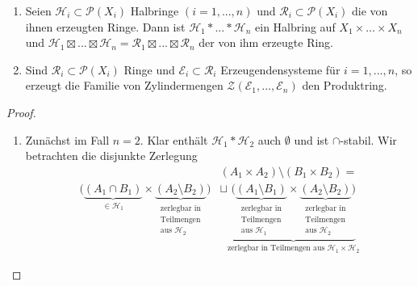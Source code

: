 \begin{proposition}
\begin{mdframed}
\begin{enumerate}[(\roman*),topsep=5pt]
	\item Seien $\mathcal{H}_i \subset \mathcal{P}(X_i)$ Halbringe $(i=1,...,n)$ und $\mathcal{R}_i \subset \mathcal{P}(X_i)$ die von ihnen erzeugten Ringe. Dann ist $\mathcal{H}_1 \ast ... \ast \mathcal{H}_n$ ein Halbring auf $X_1 \times ... \times X_n$ und $\mathcal{H}_1 \boxtimes ... \boxtimes \mathcal{H}_n =\mathcal{R}_1 \boxtimes ... \boxtimes \mathcal{R}_n$ der von ihm erzeugte Ring.
	\item Sind $\mathcal{R}_i \subset \mathcal{P}(X_i)$ Ringe und $\mathcal{E}_i \subset \mathcal{R}_i$ Erzeugendensysteme für $i=1,...,n$, so erzeugt die Familie von Zylindermengen $\mathcal{Z}(\mathcal{E}_1,...,\mathcal{E}_n)$ den Produktring.
\end{enumerate}
\end{mdframed}
\label{propC}
\begin{proof} \
\begin{enumerate}[(\roman*),topsep=5pt]
	\item Zunächst im Fall $n=2$. Klar enthält $\mathcal{H}_1 \ast \mathcal{H}_2$ auch $\emptyset$ und ist $\cap$-stabil. Wir betrachten die disjunkte Zerlegung
	\begin{equation*}
	\begin{split}
		&(A_1 \times A_2) \setminus (B_1 \times B_2) =\\
	 \big( \underbrace{(A_1 \cap B_1)}_{\in \mathcal{H}_1} \times \underbrace{(A_2 \setminus B_2)}_{\substack{\text{zerlegbar in} \\ \text{Teilmengen}\\ \text{aus }\mathcal{H}_2}} \big) & \sqcup \underbrace{\big( \underbrace{(A_1 \setminus B_1)}_{\substack{\text{zerlegbar in} \\ \text{Teilmengen}\\ \text{aus }\mathcal{H}_1}} \times \underbrace{(A_2 \setminus B_2)}_{\substack{\text{zerlegbar in} \\ \text{Teilmengen}\\ \text{aus }\mathcal{H}_2}} \big)}_{\text{zerlegbar in Teilmengen aus } \mathcal{H}_1 \times \mathcal{H}_2}

\end{split}
\end{equation*}
\end{enumerate}
\end{proof}
\end{proposition}

